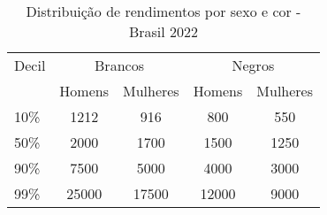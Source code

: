 \begin{table}[htb!]
    \centering
    \caption{Distribuição de rendimentos por sexo e cor - Brasil 2022}
    \begin{tabular}{lcccc}
    \hline
    Decil & \multicolumn{2}{c}{Brancos} & \multicolumn{2}{c}{Negros} \\ \cline{2-5} 
          & Homens      & Mulheres      & Homens      & Mulheres     \\ \hline
    10\%  & 1212        & 916           & 800         & 550          \\
    50\%  & 2000        & 1700          & 1500        & 1250         \\
    90\%  & 7500        & 5000          & 4000        & 3000         \\
    99\%  & 25000       & 17500         & 12000       & 9000         \\ \hline
    \end{tabular}
    \end{table}